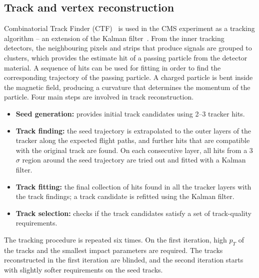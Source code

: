 \subsection{Track and vertex reconstruction}
Combinatorial Track Finder (CTF)~\cite{Chatrchyan:2014fea} is used in the CMS experiment as a tracking algorithm – an extension of the Kalman filter~\cite{Fruhwirth:1987fm}.
From the inner tracking detectors, the neighbouring pixels and strips that produce signals are grouped to clusters, which provides the estimate hit of a passing particle from the detector material. A sequence of hits can be used for fitting in order to find the corresponding trajectory of the passing particle. A charged particle is bent inside the magnetic field, producing a curvature that determines the momentum of the particle. Four main steps are involved in track reconstruction.
\begin{itemize}
\item{\textbf{Seed generation:}}
provides initial track candidates using 2–3 tracker hits.
\item{\textbf{Track finding:}}
the seed trajectory is extrapolated to the outer layers of the tracker along the expected flight paths, and further hits that are compatible with the original track are found. On each consecutive layer, all hits from a 3$\sigma$ region around the seed trajectory are tried out and fitted with a Kalman filter.
\item{\textbf{Track fitting:}}
the final collection of hits found in all the tracker layers with the track findings; a track candidate is refitted using the Kalman filter.
\item{\textbf{Track selection:}}
checks if the track candidates satisfy a set of track-quality requirements.
\end{itemize} 
The tracking procedure is repeated six times. On the first iteration, high $p_T$ of the tracks and the smallest impact parameters are required. The tracks reconstructed in the first iteration are blinded, and the second iteration starts with slightly softer requirements
on the seed tracks.
